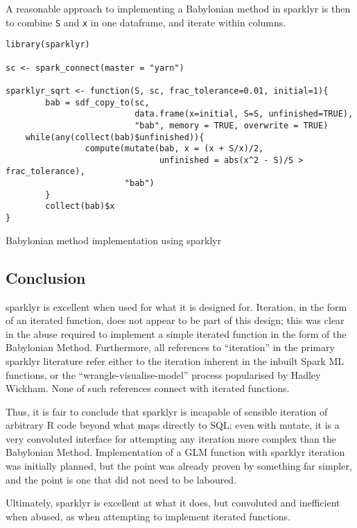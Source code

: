 A reasonable approach to implementing a Babylonian method in sparklyr is
then to combine \texttt{S} and \texttt{x} in one dataframe, and iterate
within columns.

\begin{listing}
	\begin{verbatim}
library(sparklyr)

sc <- spark_connect(master = "yarn")

sparklyr_sqrt <- function(S, sc, frac_tolerance=0.01, initial=1){
        bab = sdf_copy_to(sc,
                          data.frame(x=initial, S=S, unfinished=TRUE),
                          "bab", memory = TRUE, overwrite = TRUE)
	while(any(collect(bab)$unfinished)){
                compute(mutate(bab, x = (x + S/x)/2,
                               unfinished = abs(x^2 - S)/S > frac_tolerance),
                        "bab")
        }
        collect(bab)$x
}
\end{verbatim}
	\caption{Babylonian method implementation using sparklyr}
	\label{lst:sparklyr-bab}
\end{listing}

\hypertarget{sec:conclusion}{%
	\subsection{Conclusion}\label{sec:conclusion}}

sparklyr is excellent when used for what it is designed for. Iteration,
in the form of an iterated function, does not appear to be part of this
design; this was clear in the abuse required to implement a simple
iterated function in the form of the Babylonian Method. Furthermore, all
references to ``iteration'' in the primary sparklyr literature refer
either to the iteration inherent in the inbuilt Spark ML functions, or
the ``wrangle-visualise-model'' process popularised by Hadley
Wickham\cite{luraschi2019mastering}\cite{wickham2016r}. None of such
references connect with iterated functions.

Thus, it is fair to conclude that sparklyr is incapable of sensible
iteration of arbitrary R code beyond what maps directly to SQL; even
with mutate, it is a very convoluted interface for attempting any
iteration more complex than the Babylonian Method. Implementation of a
GLM function with sparklyr iteration was initially planned, but the
point was already proven by something far simpler, and the point is one
that did not need to be laboured.

Ultimately, sparklyr is excellent at what it does, but convoluted and
inefficient when abused, as when attempting to implement iterated
functions.